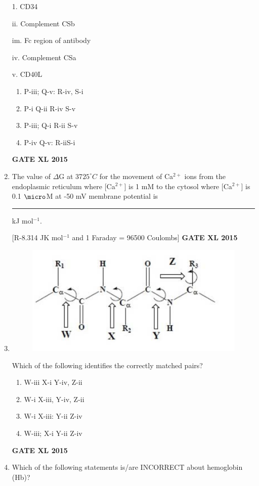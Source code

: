 \documentclass[journal,12pt,onecolumn]{IEEEtran}
\begin{document}
\begin{enumerate}
\begin{minipage}{0.5\textwidth}
\begin{flushleft}
1. CD34

ii. Complement CSb

im. Fc region of antibody

iv. Complement CSa

v. CD40L
		\end{flushleft}
	\end{minipage}

        \begin{enumerate} 
            \item P-iii; Q-v: R-iv, S-i
	    \item P-i Q-ii R-iv S-v
	    \item P-iii; Q-i R-ii S-v
            \item P-iv Q-v: R-iiS-i
	\end{enumerate}
\hfill{\textbf{GATE XL 2015}}
\item The value of $\Delta$G at 37$25^{\circ}C$ for the movement of Ca$^{2+}$ ions from the endoplasmic reticulum where [Ca$^{2+}$] is 1 mM to the cytosol where [Ca$^{2+}$] is 0.1 $\micro$M at -50 mV membrane potential is\rule{1cm}{0.15mm} kJ mol$^{-1}$.

	[R-8.314 JK mol$^{-1}$ and 1 Faraday = 96500 Coulombs]
\hfill{\textbf{GATE XL 2015}}
\item 

	\begin{figure}[h!]
		\centering
    \includegraphics{41}
		    \caption*{}
		\label{fig:Q41}
	\end{figure}

Which of the following identifies the correctly matched pairs?
        \begin{enumerate} 
            \item W-iii X-i Y-iv, Z-ii
	    \item W-i X-iii, Y-iv, Z-ii
	    \item W-i X-iii: Y-ii Z-iv
            \item W-iii; X-i Y-ii Z-iv
	\end{enumerate}
\hfill{\textbf{GATE XL 2015}}
\item Which of the following statements is/are INCORRECT about hemoglobin (Hb)?


\end{enumerate}
\end{document}
